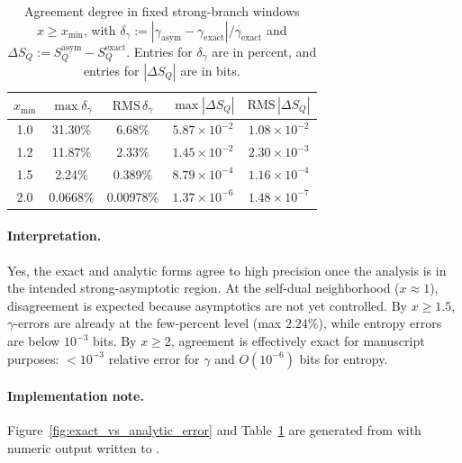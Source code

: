 \begin{table}[tbp]
  \caption{Agreement degree in fixed strong-branch windows \(x\ge x_{\min}\), with
  \(\delta_\gamma:=|\gamma_{\mathrm{asym}}-\gamma_{\mathrm{exact}}|/\gamma_{\mathrm{exact}}\) and
  \(\Delta S_Q:=S_Q^{\mathrm{asym}}-S_Q^{\mathrm{exact}}\). Entries for \(\delta_\gamma\) are in
  percent, and entries for \(|\Delta S_Q|\) are in bits.}
  \label{tab:exact_vs_analytic_metrics}
  \begin{ruledtabular}
  \begin{tabular}{ccccc}
    \(x_{\min}\) & \(\max \delta_\gamma\) & \(\mathrm{RMS}\,\delta_\gamma\) & \(\max | \Delta S_Q |\) & \(\mathrm{RMS}\,| \Delta S_Q |\) \\
    \hline
    1.0 & 31.30\% & 6.68\% & \(5.87\times10^{-2}\) & \(1.08\times10^{-2}\) \\
    1.2 & 11.87\% & 2.33\% & \(1.45\times10^{-2}\) & \(2.30\times10^{-3}\) \\
    1.5 & 2.24\% & 0.389\% & \(8.79\times10^{-4}\) & \(1.16\times10^{-4}\) \\
    2.0 & 0.0668\% & 0.00978\% & \(1.37\times10^{-6}\) & \(1.48\times10^{-7}\) \\
  \end{tabular}
  \end{ruledtabular}
\end{table}

\paragraph{Interpretation.}
Yes, the exact and analytic forms agree to high precision once the analysis is in the intended
strong-asymptotic region.
At the self-dual neighborhood (\(x\approx1\)), disagreement is expected because asymptotics are
not yet controlled.
By \(x\ge1.5\), \(\gamma\)-errors are already at the few-percent level (max \(2.24\%\)), while
entropy errors are below \(10^{-3}\) bits.
By \(x\ge2\), agreement is effectively exact for manuscript purposes:
\(<10^{-3}\) relative error for \(\gamma\) and \(O(10^{-6})\) bits for entropy.

\paragraph{Implementation note.}
Figure~\ref{fig:exact_vs_analytic_error} and
Table~\ref{tab:exact_vs_analytic_metrics} are generated from
with numeric output written to
.


